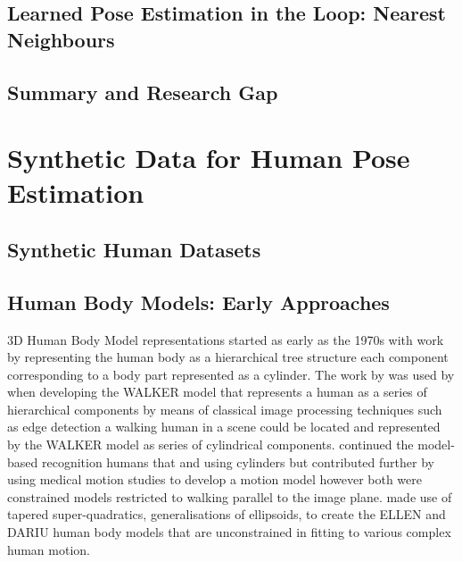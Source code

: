 \subsection{Learned Pose Estimation in the Loop: Nearest Neighbours}

\subsection{Summary and Research Gap}
\section{Synthetic Data for Human Pose Estimation}

\subsection{Synthetic Human Datasets}

\cite{varol2017learning}
\cite{patel2021agora}
\cite{yang2023synbody}
\cite{black2023bedlam}
\cite{tesch2025bedlam2}

\subsection{Human Body Models: Early Approaches}

3D Human Body Model representations started as early as the 1970s with work by \citet{marr1978representation} representing the human body as a hierarchical tree structure each component corresponding to a body part represented as a cylinder. The work by \cite{marr1978representation} was used by \citet{hogg1983model} when developing the WALKER model that represents a human as a series of hierarchical components by means of classical image processing techniques such as edge detection a walking human in a scene could be located and represented by the WALKER model as series of cylindrical components. \citet{rohr1994towards} continued the model-based recognition humans that \cite{marr1978representation} and \citet{hogg1983model}  using cylinders but contributed further by using medical motion studies to develop a motion model however both were constrained models restricted to walking parallel to the image plane.
\citet{gavrila19963} made use of tapered super-quadratics, generalisations of ellipsoids, to create the ELLEN and DARIU human body models that are unconstrained in fitting to various complex human motion. 

